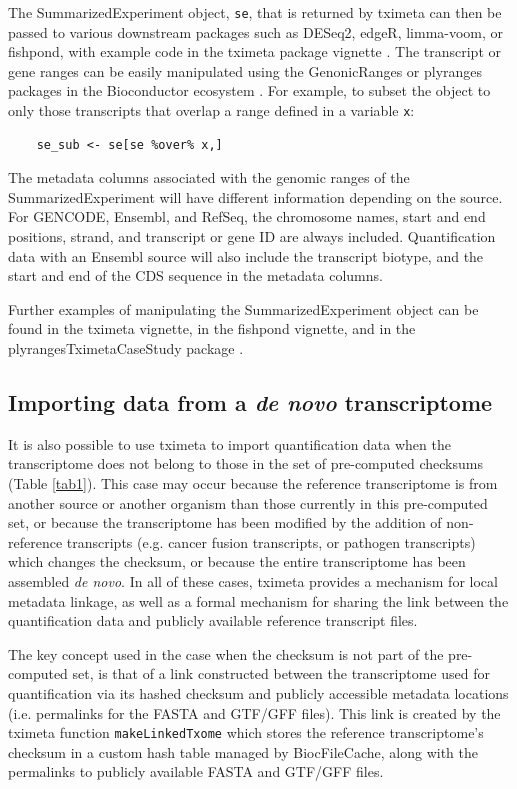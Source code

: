 \documentclass[12pt]{article} \usepackage[utf8]{inputenc}
\begin{document}
The SummarizedExperiment object, \texttt{se}, that is returned by
tximeta can then be passed to various downstream packages such as
DESeq2, edgeR, limma-voom, or fishpond, with example code in the
tximeta package vignette \citep{deseq2,edger,limma,voom,swish}. The
transcript or gene ranges can be easily manipulated using the
GenonicRanges or plyranges packages in the Bioconductor ecosystem
\citep{granges,Lee2019}. For example, to subset the object to only
those transcripts that overlap a range defined in a variable
\texttt{x}:

\begin{verbatim}
    se_sub <- se[se %over% x,]
\end{verbatim}

The metadata columns associated with the genomic ranges of the
SummarizedExperiment will have different information depending on the
source. For GENCODE, Ensembl, and RefSeq, the chromosome names, start
and end positions, strand, and transcript or gene ID are always
included. Quantification data with an Ensembl source will also include
the transcript biotype, and the start and end of the CDS sequence in
the metadata columns.

Further examples of manipulating the SummarizedExperiment object can
be found in the tximeta vignette, in the fishpond vignette, and in the
plyrangesTximetaCaseStudy package \citep{casestudy}.

\subsection*{Importing data from a \textit{de novo} transcriptome}

It is also possible to use tximeta to import quantification data when
the transcriptome does not belong to those in the set of pre-computed
checksums (Table \ref{tab1}). This case may occur because the
reference transcriptome is from another source or another organism
than those currently in this pre-computed set, or because the
transcriptome has been modified by the addition of non-reference
transcripts (e.g. cancer fusion transcripts, or pathogen transcripts)
which changes the checksum, or because the entire transcriptome has
been assembled \textit{de novo}. In all of these cases, tximeta
provides a mechanism for local metadata linkage, as well as a formal
mechanism for sharing the link between the quantification data and
publicly available reference transcript files.

The key concept used in the case when the checksum is not part of the
pre-computed set, is that of a link constructed between the
transcriptome used for quantification via its hashed checksum and
publicly accessible metadata locations (i.e. permalinks for the FASTA
and GTF/GFF files). This link is created by the tximeta function
\texttt{makeLinkedTxome} which stores the reference transcriptome's
checksum in a custom hash table managed by BiocFileCache, along with
the permalinks to publicly available FASTA and GTF/GFF files.
\end{document}
